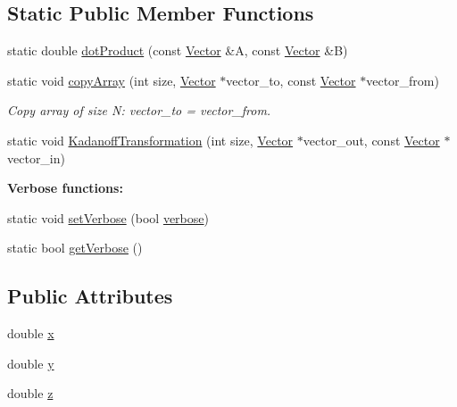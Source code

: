 \subsection*{Static Public Member Functions}
\begin{DoxyCompactItemize}
\item 
static double \hyperlink{class_p_c_a_1_1_vector_abc89550f2ef587f808a7fea91259a22a}{dot\+Product} (const \hyperlink{class_p_c_a_1_1_vector}{Vector} \&A, const \hyperlink{class_p_c_a_1_1_vector}{Vector} \&B)
\item 
static void \hyperlink{class_p_c_a_1_1_vector_a865b60bf89b1dbf3165b8cc503dce2ca}{copy\+Array} (int size, \hyperlink{class_p_c_a_1_1_vector}{Vector} $\ast$vector\+\_\+to, const \hyperlink{class_p_c_a_1_1_vector}{Vector} $\ast$vector\+\_\+from)
\begin{DoxyCompactList}\small\item\em Copy array of size N\+: vector\+\_\+to = vector\+\_\+from. \end{DoxyCompactList}\item 
static void \hyperlink{class_p_c_a_1_1_vector_a385f07b1056ab2a7648b0b9dd03cd8b0}{Kadanoff\+Transformation} (int size, \hyperlink{class_p_c_a_1_1_vector}{Vector} $\ast$vector\+\_\+out, const \hyperlink{class_p_c_a_1_1_vector}{Vector} $\ast$vector\+\_\+in)
\end{DoxyCompactItemize}
\begin{Indent}{\bf Verbose functions\+:}\par
\begin{DoxyCompactItemize}
\item 
static void \hyperlink{class_p_c_a_1_1_vector_a585f8511431df02801aa9cff0e2f1ae4}{set\+Verbose} (bool \hyperlink{class_p_c_a_1_1_vector_a6ef8075198903147f945d0ec81b8defd}{verbose})
\item 
static bool \hyperlink{class_p_c_a_1_1_vector_a06b3f5087a02159bee1f49401db7aad3}{get\+Verbose} ()
\end{DoxyCompactItemize}
\end{Indent}
\subsection*{Public Attributes}
\begin{DoxyCompactItemize}
\item 
double \hyperlink{class_p_c_a_1_1_vector_ac14a3d674fa7956b18a7e2b25aa9b4bb}{x}
\item 
double \hyperlink{class_p_c_a_1_1_vector_a75d5d6af0e3f847456d54412b86c53c0}{y}
\item 
double \hyperlink{class_p_c_a_1_1_vector_a715bde094c7e430c9c39769f6790b835}{z}
\end{DoxyCompactItemize}
